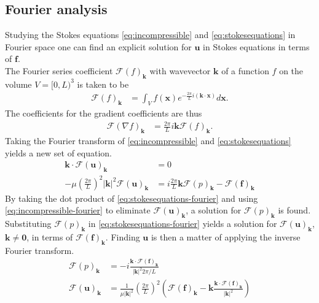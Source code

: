 \documentclass[a4paper,
twoside=false,abstract=false,numbers=noenddot,
titlepage=false,headings=small,parskip=half,version=last]{scrartcl}
\begin{document}
\subsection{Fourier analysis}
Studying the Stokes equations \eqref{eq:incompressible} and \eqref{eq:stokesequations} in Fourier space one can find an explicit solution for $\mathbf{u}$ in Stokes equations in terms of $\mathbf{f}$.\\
The Fourier series coefficient $\mathcal{F}(f)_{\mathbf{k}}$ with wavevector $\mathbf{k}$ of a function $f$ on the volume $V=[0,L)^3$ is taken to be
\begin{align}%
\mathcal{F}(f)_{\mathbf{k}} &= \int_V f(\mathbf{x}) e^{-\frac{2\pi}{L}i(\mathbf{k}\cdot \mathbf{x})}d\mathbf{x}.
    \label{eq:fourierdef}
\end{align}
The coefficients for the gradient coefficients are thus
\begin{align}
\mathcal{F}(\nabla f)_{\mathbf{k}} &= \frac{2\pi}{L}i\mathbf{k} \mathcal{F}(f)_{\mathbf{k}}.
\end{align}
Taking the Fourier transform of \eqref{eq:incompressible} and \eqref{eq:stokesequations} yields a new set of equation.
\begin{align}
\mathbf{k}\cdot \mathcal{F}(\mathbf{u})_\mathbf{k}&=0\label{eq:incompressible-fourier}\\
-\mu\left(\frac{2\pi}{L}\right)^2 |\mathbf{k}|^2 \mathcal{F}(\mathbf{u})_\mathbf{k} &= i\frac{2\pi}{L}\mathbf{k}\mathcal{F}(p)_\mathbf{k}-\mathcal{F}(\mathbf{f})_\mathbf{k}\label{eq:stokesequations-fourier}
\end{align}
By taking the dot product of \eqref{eq:stokesequations-fourier} and using \eqref{eq:incompressible-fourier} to eliminate $\mathcal{F}(\mathbf{u})_\mathbf{k}$, a solution for $\mathcal{F}(p)_\mathbf{k}$ is found.
Substituting $\mathcal{F}(p)_\mathbf{k}$ in \eqref{eq:stokesequations-fourier} yields a solution for $\mathcal{F}(\mathbf{u})_\mathbf{k}$, $\mathbf{k}\neq\mathbf{0}$, in terms of $\mathcal{F}(\mathbf{f})_\mathbf{k}$. Finding $\mathbf{u}$ is then a matter of applying the inverse Fourier transform.
\begin{align}
\mathcal{F}(p)_\mathbf{k}&=-i\frac{\mathbf{k}\cdot \mathcal{F}(\mathbf{f})_\mathbf{k}}{|\mathbf{k}|^2 2\pi/L}\nonumber\\
\mathcal{F}(\mathbf{u})_\mathbf{k}&=\frac{1}{\mu|\mathbf{k}|^2}\left(\frac{2\pi}{L}\right)^2 \left(\mathcal{F}(\mathbf{f})_\mathbf{k} - \mathbf{k} \frac{\mathbf{k}\cdot \mathcal{F}(\mathbf{f})_\mathbf{k}}{|\mathbf{k}|^2}\right)\label{eq:stokessolution-fourier}
\end{align}
\end{document}
